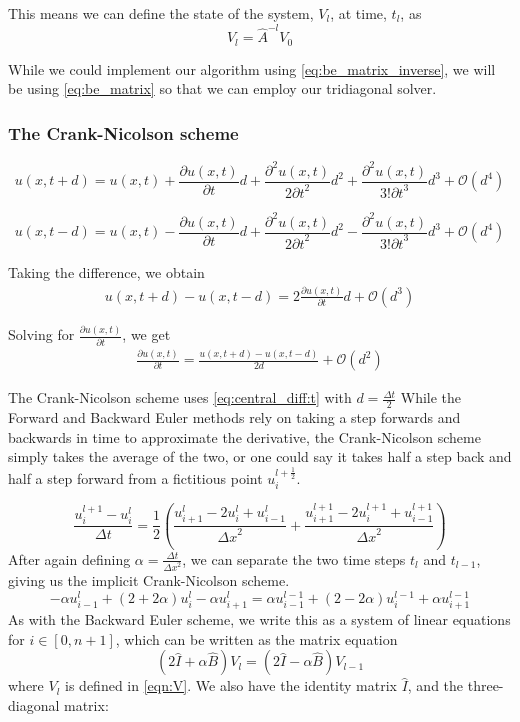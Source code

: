 \documentclass[10pt,a4paper]{article}
\newcommand{\bigO}{{\mathcal{O}}}
\newcommand{\half}{\frac{1}{2}}
\newcommand{\dt}{{\Delta t}}
\newcommand{\dx}{{\Delta x}}
\newcommand{\pt}{{\partial t}}
\newcommand{\pu}{{\partial u}}
\newcommand{\ppu}{{\partial^2 u}}
\begin{document}
This means we can define the state of the system, $V_l$, at time, $t_l$, as
\begin{equation} \label{eq:be_matrix_inverse}
V_l = \hat{A}^{-l}V_0
\end{equation}

While we could implement our algorithm using \ref{eq:be_matrix_inverse}, we will be using \ref{eq:be_matrix} so that we can employ our tridiagonal solver.

\subsubsection{The Crank-Nicolson scheme}
\begin{equation}
u(x, t + d) = u(x,t) + \frac{\pu(x,t)}{\pt}d + \frac{\ppu(x,t)}{2\pt^2}d^2 + \frac{\ppu(x,t)}{3!\pt^3}d^3 + \bigO(d^4)
\end{equation}

\begin{equation}
u(x, t - d) = u(x,t) - \frac{\pu(x,t)}{\pt}d + \frac{\ppu(x,t)}{2\pt^2}d^2 - \frac{\ppu(x,t)}{3!\pt^3}d^3 + \bigO(d^4)
\end{equation}

Taking the difference, we obtain
\begin{align}
u(x, t + d) - u(x, t - d) = 2\frac{\pu(x,t)}{\pt}d + \bigO(d^3)
\end{align}

Solving for $\frac{\pu(x,t)}{\pt}$, we get
\begin{align}
\label{eq:central_diff:t}
\frac{\pu(x,t)}{\pt} = \frac{u(x, t + d) - u(x, t - d)}{2d} + \bigO(d^2)
\end{align}

The Crank-Nicolson scheme uses \ref{eq:central_diff:t} with $d = \frac{\dt}{2}$
While the Forward and Backward Euler methods rely on taking a step forwards and backwards in time to approximate the derivative, the Crank-Nicolson scheme simply takes the average of the two, or one could say it takes half a step back and half a step forward from a fictitious point $u_i^{l+\half}$.

\begin{equation}
\frac{u_i^{l+1}-u_i^l}{\dt} = \frac{1}{2}\left( \frac{u_{i+1}^l - 2u_i^l + u_{i-1}^l}{\dx^2} + \frac{u_{i+1}^{l+1} - 2u_i^{l+1} + u_{i-1}^{l+1}}{\dx^2}\right)
\end{equation}
After again defining $\alpha = \frac{\dt}{\dx^2}$, we can separate the two time steps $t_l$ and $t_{l-1}$, giving us the implicit Crank-Nicolson scheme.
\begin{equation}
-\alpha u_{i-1}^l + (2+2\alpha)u_i^l - \alpha u_{i+1}^l = \alpha u_{i-1}^{l-1} + (2-2\alpha)u_i^{l-1} + \alpha u_{i+1}^{l-1}
\end{equation}
As with the Backward Euler scheme, we write this as a system of linear equations for $i \in [0,n+1]$, which can be written as the matrix equation
\begin{equation}\label{eqn:crank}
(2\hat{I}+\alpha \hat{B})V_l = (2\hat{I}-\alpha \hat{B})V_{l-1}
\end{equation}
where $V_l$ is defined in \vref{eqn:V}. We also have the identity matrix $\hat{I}$, and the three-diagonal matrix:
\end{document}
